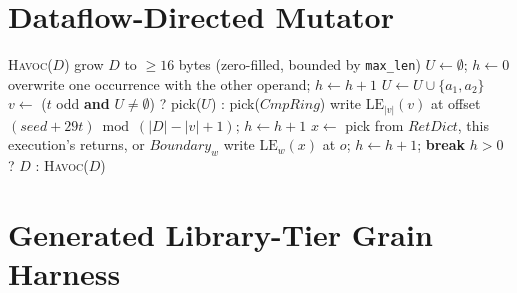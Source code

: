 \documentclass{article}
\begin{document}



\appendix
\section{Dataflow-Directed Mutator}\label{app:i2s}

\begin{algorithm}[h]
\caption{\textsc{MutateI2S}: one directed step (library tier).}\label{alg:i2s}
\begin{algorithmic}[1]
   \Return \textsc{Havoc}($D$) \EndIf
  \State grow $D$ to $\geq 16$ bytes (zero-filled, bounded by \texttt{max\_len})
  \State $U \gets \emptyset$; $h \gets 0$ 
      \State overwrite one occurrence with the other operand; $h \gets h+1$
    \Else
      \State $U \gets U \cup \{a_1, a_2\}$
    \EndIf
  \EndFor
   
    \State $v \gets$ ($t$ odd \textbf{and} $U \neq \emptyset$) ? pick($U$) : pick($\mathit{CmpRing}$)
    \State write $\mathrm{LE}_{|v|}(v)$ at offset $(\mathit{seed} + 29t) \bmod (|D| - |v| + 1)$; $h \gets h+1$
  \EndFor
        \State $x \gets$ pick from $\mathit{RetDict}$, this execution's returns, or $\mathit{Boundary}_w$
        \State write $\mathrm{LE}_w(x)$ at $o$; $h \gets h+1$; \textbf{break}
      \EndIf
    \EndFor
  \EndFor
  \State \Return $h > 0$ ? $D$ : \textsc{Havoc}($D$)
\EndFunction
\end{algorithmic}
\end{algorithm}

\section{Generated Library-Tier Grain Harness}\label{app:harness}
\end{document}
